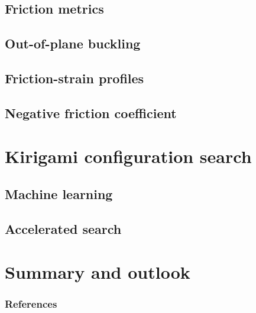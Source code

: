 \documentclass[
	10pt, %
]{beamer}
\begin{document}
\subsection{Friction metrics}
\subsection{Out-of-plane buckling}
\subsection{Friction-strain profiles}
\subsection{Negative friction coefficient}


\section{Kirigami configuration search} %
\subsection{Machine learning}
\subsection{Accelerated search}



\section{Summary and outlook} %



\begin{frame}%
	\frametitle{References}
	\printbibliography
\end{frame}
\end{document}
